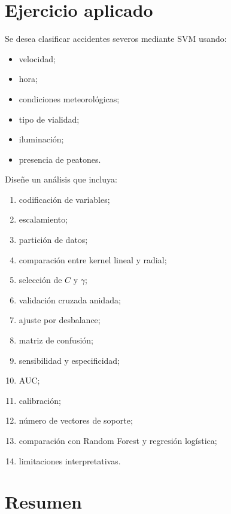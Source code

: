 \documentclass[
  spanish,
  10.5pt,
  letterpaper,
  DIV=11,
  numbers=noendperiod,
  oneside,
  open=any]{scrreprt}
\providecommand{\tightlist}{%
  \setlength{\itemsep}{0pt}\setlength{\parskip}{0pt}}
\theoremstyle{definition}
\theoremstyle{definition}
\theoremstyle{plain}
\theoremstyle{remark}
\begin{document}
\section*{Ejercicio aplicado}\label{ejercicio-aplicado-11}


Se desea clasificar accidentes severos mediante SVM usando:

\begin{itemize}
\tightlist
\item
  velocidad;
\item
  hora;
\item
  condiciones meteorológicas;
\item
  tipo de vialidad;
\item
  iluminación;
\item
  presencia de peatones.
\end{itemize}

Diseñe un análisis que incluya:

\begin{enumerate}
\def\labelenumi{\arabic{enumi}.}
\tightlist
\item
  codificación de variables;
\item
  escalamiento;
\item
  partición de datos;
\item
  comparación entre kernel lineal y radial;
\item
  selección de \(C\) y \(\gamma\);
\item
  validación cruzada anidada;
\item
  ajuste por desbalance;
\item
  matriz de confusión;
\item
  sensibilidad y especificidad;
\item
  AUC;
\item
  calibración;
\item
  número de vectores de soporte;
\item
  comparación con Random Forest y regresión logística;
\item
  limitaciones interpretativas.
\end{enumerate}

\section*{Resumen}\label{resumen-13}
\end{document}
